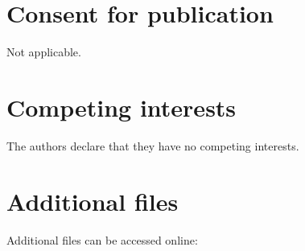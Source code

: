 \section*{Consent for publication}
Not applicable.

\section*{Competing interests}
The authors declare that they have no competing interests.

\section{Additional files}\label{Additional files}
Additional files can be accessed online: \\



